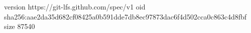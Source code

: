 version https://git-lfs.github.com/spec/v1
oid sha256:aae2da35d682cf08425a0b591dde7db8ec97873dac6f4d502cca0c863c4d8fbf
size 87540
